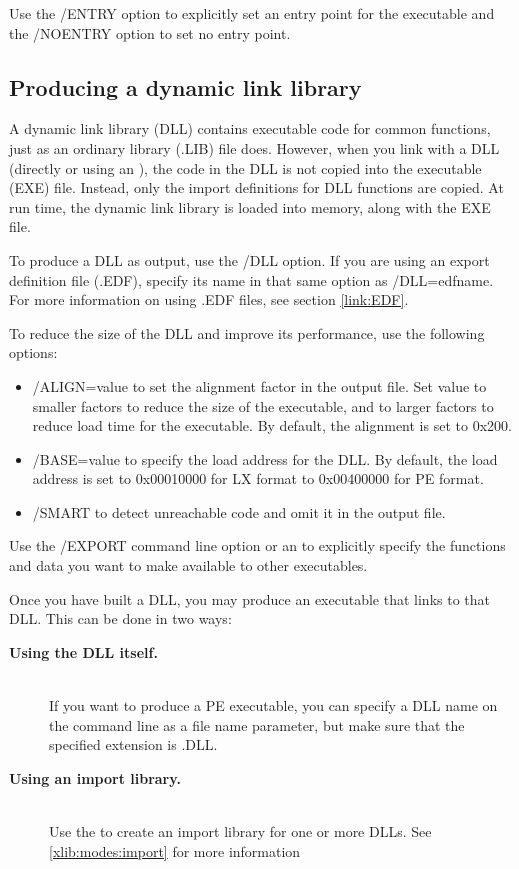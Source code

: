   Use the /ENTRY option to explicitly set an entry point for the executable and
  the /NOENTRY option to set no entry point.

\subsection{Producing a dynamic link library}
\label{link:inout:exetype:dll}

 A dynamic link library (DLL) contains executable code for common
 functions, just as an ordinary library (.LIB) file does. However, when you
 link with a DLL (directly or using an ),
 the code in the DLL is not copied into the executable (EXE) file. Instead,
 only the import definitions for DLL functions are copied. At run time,
 the dynamic link library is loaded into memory, along with the EXE file.

 To produce a DLL as output, use the /DLL option. If you are using
 an export definition file (.EDF), specify its name in that same option
 as /DLL=edfname. For more information on using .EDF files, see section
 \ref{link:EDF}.

 To reduce the size of the DLL and improve its performance, use the
 following options:

\begin{itemize}
\item  /ALIGN=value to set the alignment factor in the output file. Set
       value to smaller factors to reduce the size of the executable, and to
       larger factors to reduce load time for the executable. By default, the
       alignment is set to 0x200.
\item  /BASE=value to specify the load address for the DLL.
       By default, the load address is set to 0x00010000 for LX format
       to 0x00400000 for PE format.
\item  /SMART to detect unreachable code and omit it in the output file.
\end{itemize}

  Use the /EXPORT command line option or an
   to explicitly specify the
  functions and data you want to make available to other executables.

  Once you have built a DLL, you may produce an executable that
  links to that DLL. This can be done in two ways:
\begin{description}
\item[{\bf Using the DLL itself.}] \mbox{} \\
      If you want to produce a PE executable, you can specify a DLL
      name on the command line as a file name parameter,
      but make sure that the specified extension is .DLL.
\item[{\bf Using an import library.}] \mbox{} \\
      Use the  to create an import library
      for one or more DLLs. See \ref{xlib:modes:import} for
      more information
\end{description}


